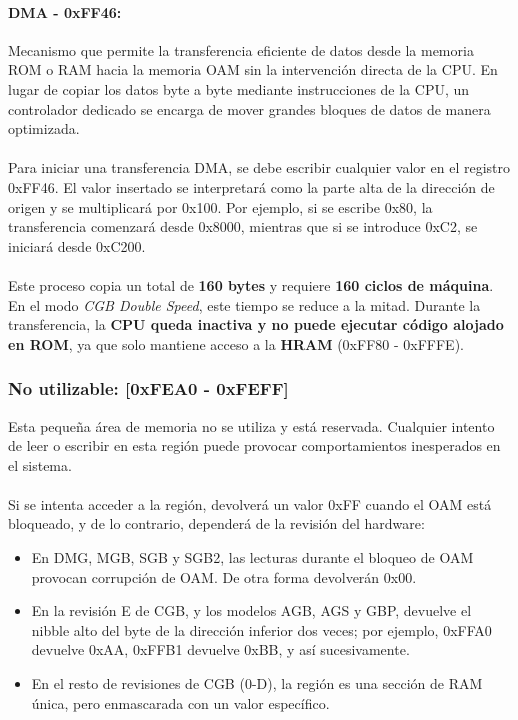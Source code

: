 \paragraph{DMA - 0xFF46:} Mecanismo que permite la transferencia eficiente de datos desde la memoria ROM o RAM hacia la memoria OAM sin la intervención directa de la CPU. En lugar de copiar los datos byte a byte mediante instrucciones de la CPU, un controlador dedicado se encarga de mover grandes bloques de datos de manera optimizada.
\\\\
Para iniciar una transferencia DMA, se debe escribir cualquier valor en el registro 0xFF46. El valor insertado se interpretará como la parte alta de la dirección de origen y se multiplicará por 0x100. Por ejemplo, si se escribe 0x80, la transferencia comenzará desde 0x8000, mientras que si se introduce 0xC2, se iniciará desde 0xC200.
\\\\
Este proceso copia un total de \textbf{160 bytes} y requiere \textbf{160 ciclos de máquina}. En el modo \textit{CGB Double Speed}, este tiempo se reduce a la mitad. Durante la transferencia, la \textbf{CPU queda inactiva y no puede ejecutar código alojado en ROM}, ya que solo mantiene acceso a la \textbf{HRAM} (0xFF80 - 0xFFFE).


\subsubsection{No utilizable: [0xFEA0 - 0xFEFF]}
Esta pequeña área de memoria no se utiliza y está reservada. Cualquier intento de leer o escribir en esta región puede provocar comportamientos inesperados en el sistema.
\\\\
Si se intenta acceder a la región, devolverá un valor 0xFF cuando el OAM está bloqueado, y de lo contrario, dependerá de la revisión del hardware:

\begin{itemize}
    \item En DMG, MGB, SGB y SGB2, las lecturas durante el bloqueo de OAM provocan corrupción de OAM. De otra forma devolverán 0x00.
    \item En la revisión E de CGB, y los modelos AGB, AGS y GBP, devuelve el nibble alto del byte de la dirección inferior dos veces; por ejemplo, 0xFFA0 devuelve 0xAA, 0xFFB1 devuelve 0xBB, y así sucesivamente.
    \item En el resto de revisiones de CGB (0-D), la región es una sección de RAM única, pero enmascarada con un valor específico.
\end{itemize}

